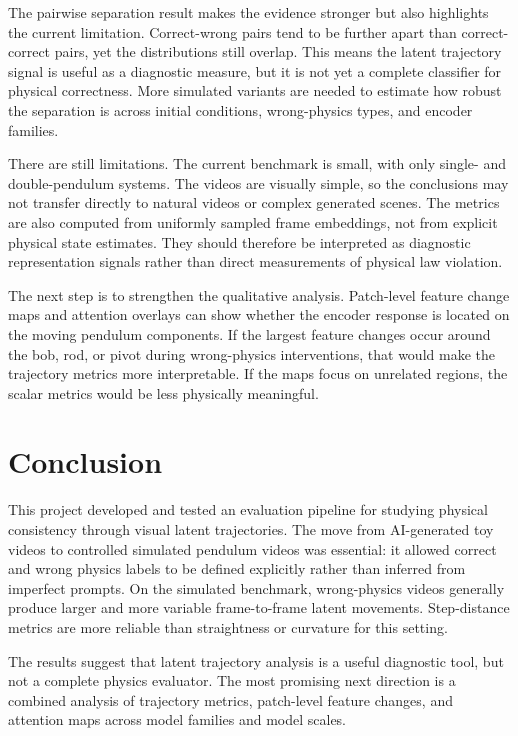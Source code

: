 \documentclass[final-report]{report-template}
\begin{document}
The pairwise separation result makes the evidence stronger but also highlights
the current limitation. Correct-wrong pairs tend to be further apart than
correct-correct pairs, yet the distributions still overlap. This means the
latent trajectory signal is useful as a diagnostic measure, but it is not yet a
complete classifier for physical correctness. More simulated variants are
needed to estimate how robust the separation is across initial conditions,
wrong-physics types, and encoder families.

There are still limitations. The current benchmark is small, with only single-
and double-pendulum systems. The videos are visually simple, so the conclusions
may not transfer directly to natural videos or complex generated scenes. The
metrics are also computed from uniformly sampled frame embeddings, not from
explicit physical state estimates. They should therefore be interpreted as
diagnostic representation signals rather than direct measurements of physical
law violation.

The next step is to strengthen the qualitative analysis. Patch-level feature
change maps and attention overlays can show whether the encoder response is
located on the moving pendulum components. If the largest feature changes occur
around the bob, rod, or pivot during wrong-physics interventions, that would
make the trajectory metrics more interpretable. If the maps focus on unrelated
regions, the scalar metrics would be less physically meaningful.

\section{Conclusion}
This project developed and tested an evaluation pipeline for studying physical
consistency through visual latent trajectories. The move from AI-generated toy
videos to controlled simulated pendulum videos was essential: it allowed correct
and wrong physics labels to be defined explicitly rather than inferred from
imperfect prompts. On the simulated benchmark, wrong-physics videos generally
produce larger and more variable frame-to-frame latent movements. Step-distance
metrics are more reliable than straightness or curvature for this setting.

The results suggest that latent trajectory analysis is a useful diagnostic tool,
but not a complete physics evaluator. The most promising next direction is a
combined analysis of trajectory metrics, patch-level feature changes, and
attention maps across model families and model scales.


\end{document}
